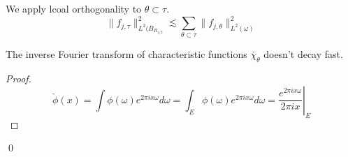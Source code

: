 We apply lcoal orthogonality to $\theta\subset\tau$. 
\begin{equation*}
    \|f_{j,\tau}\|_{L^2(B_{R_{1/2}}}^2\lesssim \sum_{\theta\subset\tau}\|f_{j,\theta}\|_{L^2(\omega)}^2
\end{equation*}

\begin{proposition}
    The inverse Fourier transform of characteristic functions $\check{\chi_\theta}$ doesn't decay fast. 
\end{proposition}
\begin{proof}
\begin{equation*}
    \check{\phi}(x)=\int\phi(\omega)e^{2\pi ix\omega}d\omega=\int_E\phi(\omega)e^{2\pi ix\omega}d\omega=\left.\frac{e^{2\pi ix\omega}}{2\pi ix}\right\vert_E
\end{equation*}
\end{proof}
\qed

